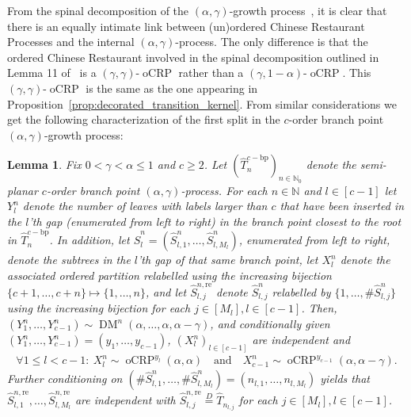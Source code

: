 \documentclass[a4paper, final]{amsart}
\theoremstyle{plain}
\newtheorem{lemma}[thm]{Lemma}
\theoremstyle{definition}
\newcommand{\That}[1][T]{\widehat{#1}}
\DeclareMathOperator{\ocrp}{oCRP}
\DeclareMathOperator{\dirmult}{DM}
\newcommand{\nin}{{n \in \mathbb{N}}}
\newcommand{\deq}{\stackrel{D}{=}}
\newcommand{\N}{\mathbb{N}}
\begin{document}
From the spinal decomposition of the $(\alpha, \gamma)$-growth process~\cite{RefWorks:doc:5b4cbb5fe4b02dc0c79270af}, it is clear that there is an equally intimate link between (un)ordered Chinese Restaurant Processes and the internal $(\alpha, \gamma)$-process.
The only difference is that the ordered Chinese Restaurant involved in the spinal decomposition outlined in Lemma 11 of~\cite{RefWorks:doc:5b4cbb5fe4b02dc0c79270af} is a $(\gamma, \gamma)$-$\ocrp$ rather than a $(\gamma, 1-\alpha)$-$\ocrp$.
This $(\gamma, \gamma)$-$\ocrp$ is the same as the one appearing in Proposition~\ref{prop:decorated_transition_kernel}.
%
From similar considerations we get the following characterization of the first split in the $c$-order branch point $(\alpha, \gamma)$-growth process:
%
\begin{lemma}%
\label{lemma:k_bp_alphagammaprocess}
Fix $0 < \gamma < \alpha \leq 1$ and $c \geq 2$.
Let ${\left( \That_{n}^{c-\text{bp}} \right)}_{n \in \N_0}$ denote the semi-planar $c$-order branch point $(\alpha, \gamma)$-process.
For each $\nin$ and $l \in [c-1]$ let $Y_l^n$ denote the number of leaves with labels larger than $c$ that have been inserted in the $l$'th gap (enumerated from left to right) in the branch point closest to the root in $\That_n^{c-\text{bp}}$.
In addition, let ${\That[S]}_l^n = \left( {\That[S]}_{l,1}^n, \ldots, {\That[S]}_{l,M_l}^n \right)$, enumerated from left to right, denote the subtrees in the $l$'th gap of that same branch point, let $X_l^n$ denote the associated ordered partition relabelled using the increasing bijection $\{c + 1, \ldots, c + n\} \mapsto \{1, \ldots, n\}$, and let ${\That[S]}_{l,j}^{n, \text{re}}$ denote ${\That[S]}_{l,j}^{n}$ relabelled by $\{1, \ldots, \# {\That[S]}_{l,j}^n \}$ using the increasing bijection for each $j \in [M_l], l \in [c - 1]$. 
  Then, $(Y_1^n,\ldots, Y_{c-1}^n) \sim \dirmult^n(\alpha, \ldots, \alpha, \alpha - \gamma)$, and conditionally given $\left( Y_1^n, \ldots, Y_{c-1}^n \right) = \left( y_1, \ldots, y_{c-1} \right)$, ${\left( X_l^n \right)}_{l \in [c-1]}$ are independent and
  \begin{align*}
    \forall 1 \leq l < c-1 \colon \ X_l^n \sim \ocrp^{y_l} \left( \alpha, \alpha \right)
    \quad \text{and} \quad
    X_{c-1}^n \sim \ocrp^{y_{c-1}} \left( \alpha, \alpha - \gamma \right).
  \end{align*}
  Further conditioning on $\left( \# {\That[S]}_{l,1}^n, \ldots, \# {\That[S]}_{l,M_l}^n\right) = \left( n_{l,1}, \ldots, n_{l,M_l} \right)$ yields that \\
  ${\That[S]}_{l,1}^{n, \text{re}}, \ldots, {\That[S]}_{l,M_l}^{n, \text{re}}$ are independent with ${\That[S]}_{l,j}^{n, \text{re}} \deq \That_{n_{l,j}}$ for each $j \in [M_l], l \in [c-1]$.
\end{lemma}
\end{document}
